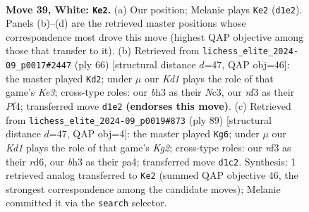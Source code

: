 \documentclass[11pt]{article}
\begin{document}
\clearpage

\begin{figure}[p]\centering
\begin{subfigure}{0.46\textwidth}\centering
\resizebox{\linewidth}{!}{%
\newchessgame
\chessboard[
  setfen={7k/R4p1p/5rp1/3P4/1p2P3/5nPb/7P/1r1K3R w - - 2 39},
  showmover=false,
  pgfstyle=straightmove, color=movearrow, markmove={d1-e2}
]}
\caption{}
\end{subfigure}\hfill
\begin{subfigure}{0.46\textwidth}\centering
\resizebox{\linewidth}{!}{%
\newchessgame
\chessboard[
  setfen={R7/1p2kp1p/1r3np1/p3P3/5P2/1PN1K2r/1P6/3R4 w - - 1 34},
  showmover=false,
  pgfstyle=straightmove, color=movearrow, markmove={e3-d2}
]}
\caption{}
\end{subfigure}
\\[4pt]
\begin{subfigure}{0.46\textwidth}\centering
\resizebox{\linewidth}{!}{%
\newchessgame
\chessboard[
  setfen={1r6/6k1/1p1R1p2/p7/P1P1r1p1/1P1R4/5KP1/8 b - - 3 45},
  showmover=false,
  pgfstyle=straightmove, color=movearrow, markmove={g7-g6}
]}
\caption{}
\end{subfigure}\hfill

\caption{\textbf{Move 39, White: \texttt{Ke2}.} (a) Our position; Melanie plays \texttt{Ke2} (\texttt{d1e2}). Panels (b)--(d) are the retrieved master positions whose correspondence most drove this move (highest QAP objective among those that transfer to it). (b) Retrieved from \texttt{lichess\_elite\_2024-09\_p0017\#2447} (ply 66) [structural distance $d$=47, QAP obj=46]: the master played \texttt{Kd2}; under $\mu$ our \emph{Kd1} plays the role of that game's \emph{Ke3}; cross-type roles: our \emph{b}h3 as their \emph{N}c3, our \emph{n}f3 as their \emph{P}f4; transferred move \texttt{d1e2} \textbf{(endorses this move)}. (c) Retrieved from \texttt{lichess\_elite\_2024-09\_p0019\#873} (ply 89) [structural distance $d$=47, QAP obj=4]: the master played \texttt{Kg6}; under $\mu$ our \emph{Kd1} plays the role of that game's \emph{Kg2}; cross-type roles: our \emph{n}f3 as their \emph{r}d6, our \emph{b}h3 as their \emph{p}a4; transferred move \texttt{d1c2}. Synthesis: 1 retrieved analog transferred to \texttt{Ke2} (summed QAP objective 46, the strongest correspondence among the candidate moves); Melanie committed it via the \texttt{search} selector.}
\label{fig:thought-m76}
\end{figure}

\clearpage
\end{document}
